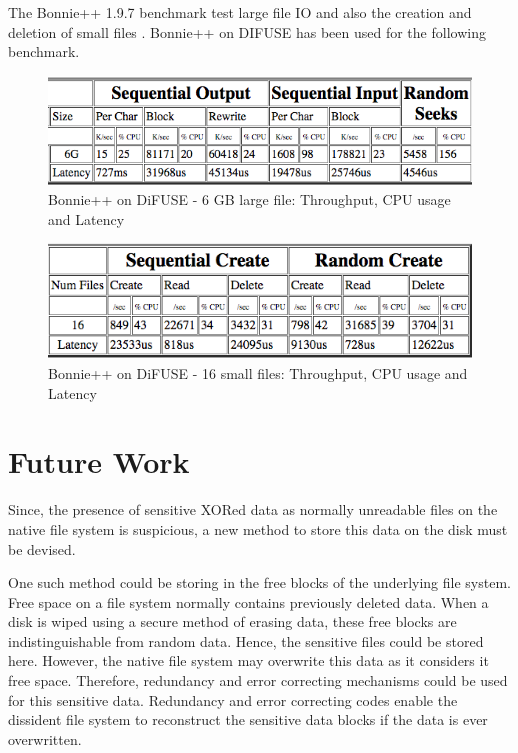 \documentclass[10pt,twocolumn]{article}
\begin{document}
The Bonnie++ 1.9.7 benchmark test large file IO and also the creation and deletion of small files \cite{bonnie}. Bonnie++ on DIFUSE has been used for the following benchmark.
\begin{figure}[thpb]
  \centering
  	\includegraphics[width=\columnwidth]{bonnie1}
    \caption{Bonnie++ on DiFUSE - 6 GB large file: Throughput, CPU usage and Latency}
	\label{fig:bonnie1}
\end{figure}

\begin{figure}[thpb]
  \centering
  	\includegraphics[width=\columnwidth]{bonnie2}
    \caption{Bonnie++ on DiFUSE - 16 small files: Throughput, CPU usage and Latency}
	\label{fig:bonnie2}
\end{figure}

\section{Future Work}

Since, the presence of sensitive XORed data as normally unreadable files on the native file system is suspicious, a new method to store this data on the disk must be devised.

One such method could be storing in the free blocks of the underlying file system. Free space on a file system normally contains previously deleted data. When a disk is wiped using a secure method of erasing data, these free blocks are indistinguishable from random data. Hence, the sensitive files could be stored here. However, the native file system may overwrite this data as it considers it free space. Therefore, redundancy and error correcting mechanisms could be used for this sensitive data. Redundancy and error correcting codes enable the dissident file system to reconstruct the sensitive data blocks if the data is ever overwritten.
\end{document}
